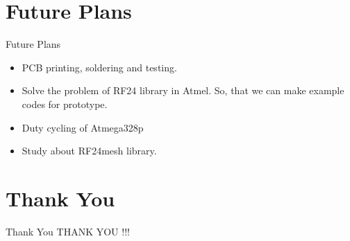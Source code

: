 \documentclass[10pt, a4paper]{beamer}
\begin{document}
\section{Future Plans}
\begin{frame}{Future Plans}
	\begin{itemize}
		\item PCB printing, soldering and testing.
        \item Solve the problem of RF24 library in Atmel. So, that we can make example codes for prototype.
        \item Duty cycling of Atmega328p
        \item Study about RF24mesh library.
	\end{itemize}
\end{frame}


\section{Thank You}
\begin{frame}{Thank You}
	\centering THANK YOU !!!
\end{frame}
\end{document}
